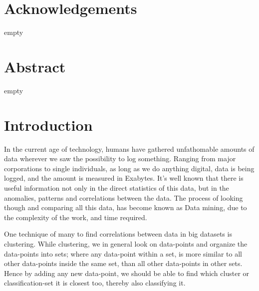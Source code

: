 \documentclass[a4paper]{article}
\begin{document}
%
%


%
%
\section*{Acknowledgements}
empty
\newpage

%
%
\section*{Abstract}
empty
\newpage

%
%
\tableofcontents
\newpage

%
%
\listofalgorithms
\newpage



%
%
\section{Introduction}
In the current age of technology, humans have gathered unfathomable amounts of data wherever
we saw the possibility to log something. Ranging from major corporations to single individuals,
as long as we do anything digital, data is being logged, and the amount is measured in Exabytes.
It's well known that there is useful information not only in the direct statistics of this data,
but in the anomalies, patterns and correlations between the data. The process of looking though and
comparing all this data, has become known as Data mining, due to the complexity of the work,
and time required.

One technique of many to find correlations between data in big datasets is clustering. While
clustering, we in general look on data-points and organize the data-points
into sets; where any data-point within a set, is more similar to all other data-points inside
the same set, than all other data-points in other sets. Hence by adding any new
data-point, we should be able to find which cluster or classification-set it is closest too,
thereby also classifying it. \cite{gan07}
\end{document}
